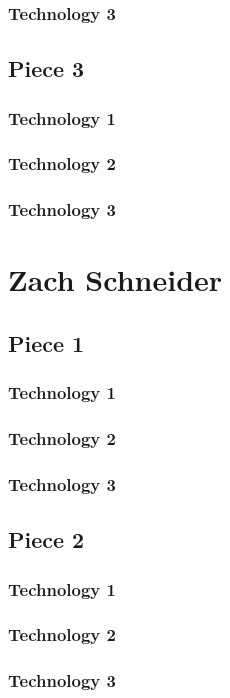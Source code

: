 \documentclass[letterpaper,10pt,titlepage,draftclsnofoot,onecolumn,onesided] {IEEEtran}
\begin{document}
\subsubsection{Technology 3}

\subsection{Piece 3}
\subsubsection{Technology 1}
\subsubsection{Technology 2}
\subsubsection{Technology 3}


\section{Zach Schneider}
\subsection{Piece 1}
\subsubsection{Technology 1}
\subsubsection{Technology 2}
\subsubsection{Technology 3}

\subsection{Piece 2}
\subsubsection{Technology 1}
\subsubsection{Technology 2}
\subsubsection{Technology 3}
\end{document}
